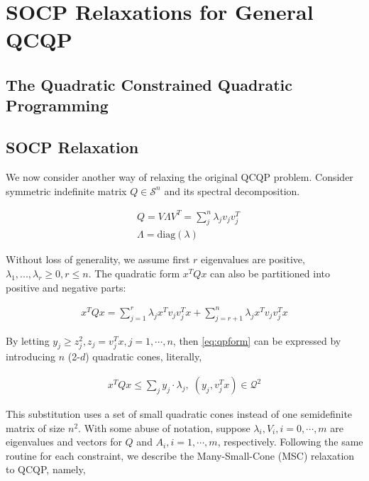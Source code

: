 \documentclass[../main]{subfiles}
\begin{document}
\section{SOCP Relaxations for General QCQP}

\subsection{The Quadratic Constrained Quadratic Programming}

\subsection{SOCP Relaxation}

We now consider another way of relaxing the original QCQP problem. Consider symmetric indefinite matrix \(Q \in \mathcal{S}^n\) and its spectral decomposition.

\begin{equation}
  \begin{aligned}
     & Q = V\Lambda V ^T =\sum_j^n \lambda_j v_j  v_j^T \\
     & \Lambda = \mathrm{diag}(\lambda)
  \end{aligned}
\end{equation}

Without loss of generality, we assume first \(r\) eigenvalues are positive, \(\lambda_1, ..., \lambda_r \ge 0, r\le n \). The quadratic form \(x^TQx\) can also be partitioned into positive and negative parts:

\begin{equation}\label{eq:qpform}
  \begin{aligned}
    x^TQx = \sum_{j=1}^r \lambda_j x^T v_j v_j^T x + \sum_{j=r+1}^n \lambda_j x^T v_j v_j^T x
  \end{aligned}
\end{equation}

By letting \(y_j \ge z_j^2, z_j = v_j^T x, j = 1, \cdots, n\), then \eqref{eq:qpform} can be expressed by introducing \(n\) (2-\(d\)) quadratic cones, literally,

\begin{equation}
  \begin{aligned}
    x^TQx \le \sum_j y_j \cdot \lambda_j,\; (y_j, v^T_j x) \in \mathcal{Q}^2
  \end{aligned}
\end{equation}

This substitution uses a set of small quadratic cones instead of one semidefinite matrix of size \(n^2\). With some abuse of notation, suppose \(\lambda_i, V_i, i = 0, \cdots, m\) are eigenvalues and vectors for \(Q\) and \(A_i, i = 1,
\cdots, m\), respectively. Following the same routine for each constraint, we describe the Many-Small-Cone (MSC) relaxation to QCQP, namely,
\end{document}

